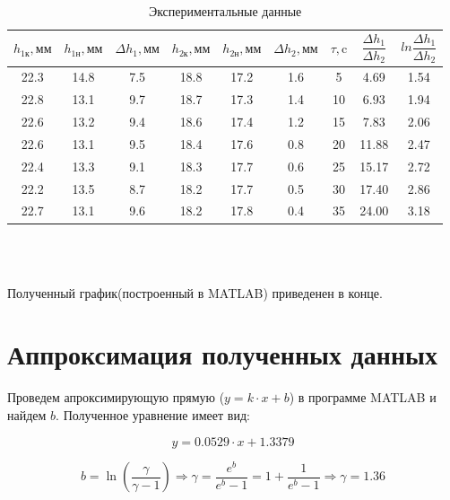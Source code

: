 \begin{center}
\begin{table}[h]
		\caption{Экспериментальные данные}
\begin{tabular}{|c|c|c|c|c|c|c|c|c|} \hline
$h_{1\text{к}}, \text{мм}$ & $h_{1\text{н}}, \text{мм}$ & $\Delta h_1, \text{мм}$ & $h_{2\text{к}}, \text{мм}$ & $h_{2\text{н}}, \text{мм}$ & $\Delta h_2, \text{мм}$ & $\tau, \text{c}$ & $\dfrac{\Delta h_1}{\Delta h_2}$ & $ln\dfrac{\Delta h_1}{\Delta h_2}$ \\ \hline
22.3 & 14.8 & 7.5 & 18.8 & 17.2 & 1.6 &  5 &  4.69 & 1.54  \\ \hline
22.8 & 13.1 & 9.7 & 18.7 & 17.3 & 1.4 & 10 &  6.93 & 1.94  \\ \hline
22.6 & 13.2 & 9.4 & 18.6 & 17.4 & 1.2 & 15 &  7.83 & 2.06  \\ \hline
22.6 & 13.1 & 9.5 & 18.4 & 17.6 & 0.8 & 20 & 11.88 & 2.47  \\ \hline
22.4 & 13.3 & 9.1 & 18.3 & 17.7 & 0.6 & 25 & 15.17 & 2.72  \\ \hline
22.2 & 13.5 & 8.7 & 18.2 & 17.7 & 0.5 & 30 & 17.40 & 2.86  \\ \hline
22.7 & 13.1 & 9.6 & 18.2 & 17.8 & 0.4 & 35 & 24.00 & 3.18  \\ \hline
\end{tabular}\\\\

\end{table}
\end{center}

Полученный график(построенный в MATLAB) приведенен в конце.



\section{Аппроксимация полученных данных}

Проведем апроксимирующую прямую ($y = k\cdot x + b$) в программе MATLAB и найдем $b$. Полученное уравнение имеет вид:

\begin{equation}
	y = 0.0529\cdot x + 1.3379
\end{equation}

\begin{equation}
	b = \ln \left(\dfrac{\gamma}{\gamma - 1}\right) \Rightarrow \gamma = \frac{e^b}{e^b - 1} = 1 + \frac{1}{e^b - 1} \Rightarrow \gamma = 1.36
\end{equation}


